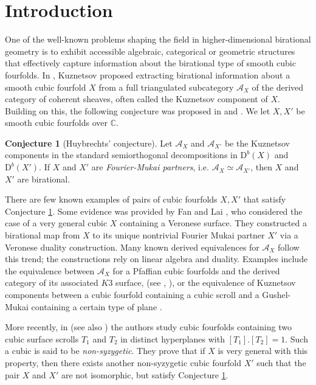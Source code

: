 \documentclass[11pt]{amsart}
\theoremstyle{plain}
\numberwithin{equation}{section}
\theoremstyle{definition}
\newtheorem{conjecture}[theorem]{Conjecture}
\theoremstyle{remark}
\newcommand{\bC}{\mathbb{C}}
\newcommand{\calA}{\mathcal{A}}
\begin{document}
\maketitle 

\section{Introduction}\label{sIntroduction}
One of the well-known problems shaping the field in higher-dimensional birational geometry is to exhibit accessible algebraic, categorical or geometric structures that effectively capture information about the birational type of smooth cubic fourfolds. In \cite{kuzcubic}, Kuznetsov proposed extracting birational information about a smooth cubic fourfold $X$ from a full triangulated subcategory $\calA_X$ of the derived category of coherent sheaves, often called the Kuznetsov component of $X$. Building on this, the following conjecture was proposed in \cite[Chapter 7, Conjecture 3.21]{Huybrechtscubicsbook} and \cite[Conjecture 2.5]{Huybrechts:2025aa}. We let $X, X'$ be smooth cubic fourfolds over $\bC$.

\begin{conjecture}[Huybrechts' conjecture]  \label{conj: Huy}
    Let $\mathcal{A}_X$ and $\mathcal{A}_{X'}$ be the Kuznetsov components in the standard semiorthogonal decompositions in $\mathrm{D}^b (X) $ and $\mathrm{D}^b (X')$.
 If $X$ and $X'$ are \emph{Fourier-Mukai partners}, i.e. $\mathcal{A}_X\simeq \mathcal{A}_{X'}$, then $X$ and $X'$ are birational. 
\end{conjecture}
There are few known examples of pairs of cubic fourfolds $X,X'$ that satisfy Conjecture \ref{conj: Huy}. Some evidence was provided by Fan and Lai \cite{FanLaiCremona}, who considered the case of a very general cubic $X$ containing a Veronese surface. They constructed a birational map from $X$ to its unique nontrivial Fourier Mukai partner $X'$ via a Veronese duality construction. Many known derived equivalences for $\mathcal{A}_X$ follow this trend; the constructions rely on  linear algebra and duality. Examples include the equivalence between $\calA_X$ for a Pfaffian cubic fourfolds and the derived category of its associated $K3$ surface, (see \cite{BD85}, \cite{KuznetsovHPDGrassmannians}), or the equivalence of Kuznetsov components between a cubic fourfold containing a cubic scroll and a Gushel-Mukai containing a certain type of plane \cite{KuzPerry}.

More recently, in \cite{Brooke:2024aa} (see also \cite{BFMQ24}) the authors study cubic fourfolds containing two cubic surface scrolls $T_1$ and $T_2$ in distinct hyperplanes with $[T_1].[T_2]=1$. Such a cubic is said to be \textit{non-syzygetic}. 
They prove that if $X$ is very general with this property, then there exists another non-syzygetic cubic fourfold $X'$ such that the pair $X$ and $X'$ are not isomorphic, but satisfy Conjecture \ref{conj: Huy}. %
\end{document}
